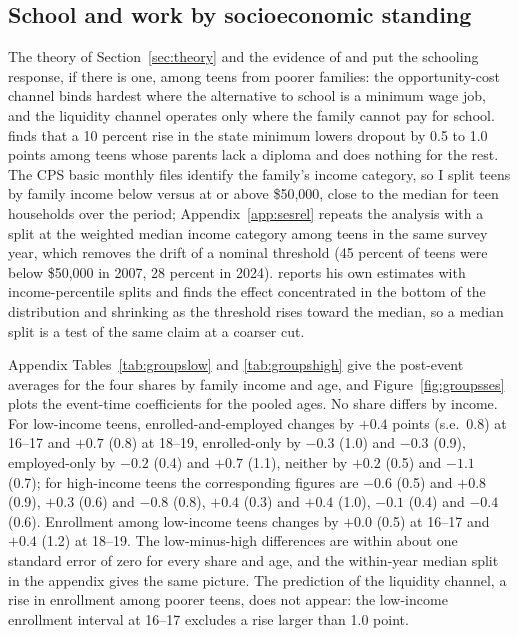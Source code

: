 \documentclass[12pt]{article}
\begin{document}
\subsection{School and work by socioeconomic standing}\label{sec:groupsses}

The theory of Section~\ref{sec:theory} and the evidence of \citet{ehrenberg1982} and \citet{smith2021} put the schooling response, if there is one, among teens from poorer families: the opportunity-cost channel binds hardest where the alternative to school is a minimum wage job, and the liquidity channel operates only where the family cannot pay for school. \citet{smith2021} finds that a 10 percent rise in the state minimum lowers dropout by 0.5 to 1.0 points among teens whose parents lack a diploma and does nothing for the rest. The CPS basic monthly files identify the family's income category, so I split teens by family income below versus at or above \$50,000, close to the median for teen households over the period; Appendix~\ref{app:sesrel} repeats the analysis with a split at the weighted median income category among teens in the same survey year, which removes the drift of a nominal threshold (45 percent of teens were below \$50,000 in 2007, 28 percent in 2024). \citet{smith2021} reports his own estimates with income-percentile splits and finds the effect concentrated in the bottom of the distribution and shrinking as the threshold rises toward the median, so a median split is a test of the same claim at a coarser cut.

Appendix Tables~\ref{tab:groupslow} and \ref{tab:groupshigh} give the post-event averages for the four shares by family income and age, and Figure~\ref{fig:groupsses} plots the event-time coefficients for the pooled ages. No share differs by income. For low-income teens, enrolled-and-employed changes by $+0.4$ points (s.e.\ 0.8) at 16--17 and $+0.7$ (0.8) at 18--19, enrolled-only by $-0.3$ (1.0) and $-0.3$ (0.9), employed-only by $-0.2$ (0.4) and $+0.7$ (1.1), neither by $+0.2$ (0.5) and $-1.1$ (0.7); for high-income teens the corresponding figures are $-0.6$ (0.5) and $+0.8$ (0.9), $+0.3$ (0.6) and $-0.8$ (0.8), $+0.4$ (0.3) and $+0.4$ (1.0), $-0.1$ (0.4) and $-0.4$ (0.6). Enrollment among low-income teens changes by $+0.0$ (0.5) at 16--17 and $+0.4$ (1.2) at 18--19. The low-minus-high differences are within about one standard error of zero for every share and age, and the within-year median split in the appendix gives the same picture. The prediction of the liquidity channel, a rise in enrollment among poorer teens, does not appear: the low-income enrollment interval at 16--17 excludes a rise larger than 1.0 point.
\end{document}
